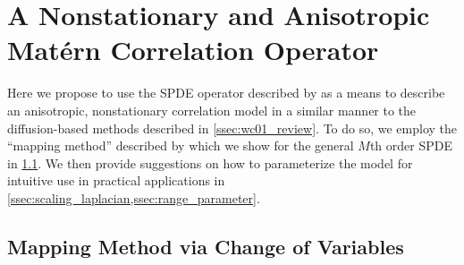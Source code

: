 \section{A Nonstationary and Anisotropic Mat\'ern Correlation Operator}
\label{sec:matern_operator}

Here we propose to use the SPDE operator described by \citet{RSSB:RSSB777}
as a means to describe an anisotropic, nonstationary correlation model in a
similar manner to the diffusion-based methods described in
\cref{ssec:wc01_review}.
To do so, we employ the ``mapping method'' described by \citet{RSSB:RSSB777}
which we show for the general $M$th order SPDE in \cref{ssec:mapping_method}.
We then provide suggestions on how to parameterize the model for intuitive use
in practical applications in \cref{ssec:scaling_laplacian,ssec:range_parameter}.


\subsection{Mapping Method via Change of Variables}
\label{ssec:mapping_method}

